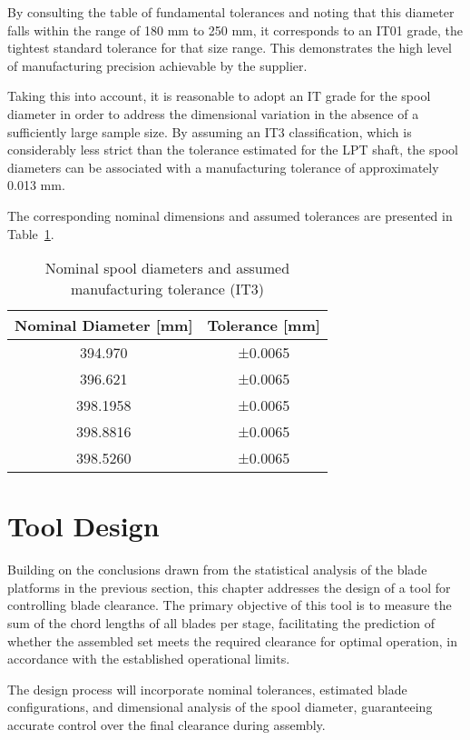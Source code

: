 By consulting the table of fundamental tolerances and noting that this diameter falls within the range of 180 mm to 250 mm, it corresponds to an IT01 grade, the tightest standard tolerance for that size range. This demonstrates the high level of manufacturing precision achievable by the supplier.

Taking this into account, it is reasonable to adopt an IT grade for the spool diameter in order to address the dimensional variation in the absence of a sufficiently large sample size. By assuming an IT3 classification, which is considerably less strict than the tolerance estimated for the \gls{LPT} shaft, the spool diameters can be associated with a manufacturing tolerance of approximately 0.013 mm.

The corresponding nominal dimensions and assumed tolerances are presented in Table~\ref{tab:spool_nominal_tolerance}.

\begin{table}[H]
    \centering
    \caption{Nominal spool diameters and assumed manufacturing tolerance (IT3)}
    \label{tab:spool_nominal_tolerance}
    \begin{tabular}{cc}
        \hline
        \textbf{Nominal Diameter [mm]} & \textbf{Tolerance [mm]} \\
        \hline
        394.970 & ±0.0065 \\
        396.621 & ±0.0065 \\
        398.1958 & ±0.0065 \\
        398.8816 & ±0.0065 \\
        398.5260 & ±0.0065 \\
        \hline
    \end{tabular}
\end{table}


\section{Tool Design}

Building on the conclusions drawn from the statistical analysis of the blade platforms in the previous section, this chapter addresses the design of a tool for controlling blade clearance. 
The primary objective of this tool is to measure the sum of the chord lengths of all blades per stage, facilitating the prediction of whether the assembled set meets the required clearance for optimal operation, in accordance with the established operational limits.

The design process will incorporate nominal tolerances, estimated blade configurations, and dimensional analysis of the spool diameter, guaranteeing accurate control over the final clearance during assembly.

